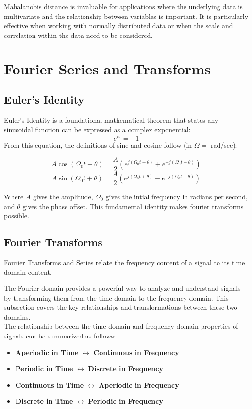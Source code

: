 \documentclass[12pt]{article}
\begin{document}
Mahalanobis distance is invaluable for applications where the underlying data is multivariate and the relationship between variables is important. It is particularly effective when working with normally distributed data or when the scale and correlation within the data need to be considered.
\section{Fourier Series and Transforms}
\subsection{Euler's Identity}
Euler's Identity is a foundational mathematical theorem that states any sinusoidal function can be expressed as a complex exponential: 
\[e^{i\pi} = -1\]
From this equation, the definitions of sine and cosine follow (in \(\Omega = \) rad/sec):

\[A\cos (\Omega_0 t + \theta) = \frac{A}{2}\left(e^{j(\Omega_0 t + \theta)} + e^{-j(\Omega_0 t + \theta)} \right)\]
\[A\sin (\Omega_0 t + \theta) = \frac{A}{2}\left(e^{j(\Omega_0 t + \theta)} - e^{-j(\Omega_0 t + \theta)} \right)\]

Where \(A\) gives the amplitude, \(\Omega_0\) gives the intial frequency in radians per second, and \(\theta\) gives the phase offset. This fundamental identity makes fourier transforms possible.
\subsection{Fourier Transforms}

Fourier Transforms and Series relate the frequency content of a signal to its time domain content. 

The Fourier domain provides a powerful way to analyze and understand signals by transforming them from the time domain to the frequency domain. This subsection covers the key relationships and transformations between these two domains.\\
The relationship between the time domain and frequency domain properties of signals can be summarized as follows:
\begin{itemize}
    \item \textbf{Aperiodic in Time} $\leftrightarrow$ \textbf{Continuous in Frequency}
    \item \textbf{Periodic in Time} $\leftrightarrow$ \textbf{Discrete in Frequency}
    \item \textbf{Continuous in Time} $\leftrightarrow$ \textbf{Aperiodic in Frequency}
    \item \textbf{Discrete in Time} $\leftrightarrow$ \textbf{Periodic in Frequency}
\end{itemize}
\end{document}
